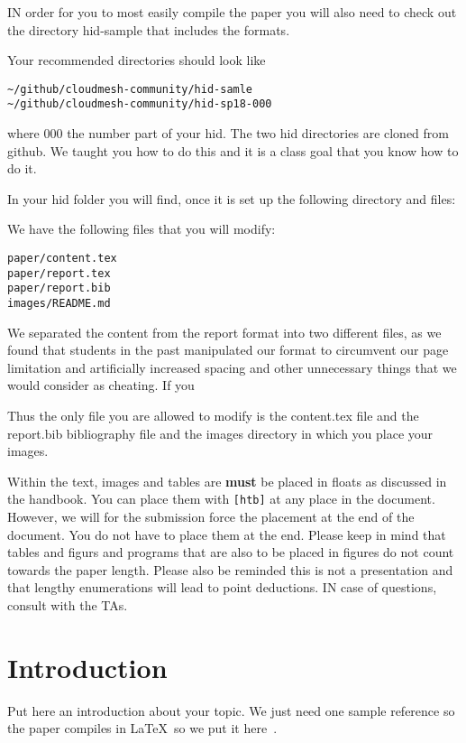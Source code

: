 IN order for you to most easily compile the paper you will also need
to check out the directory hid-sample that includes the formats. 

Your recommended directories should look like

\begin{verbatim}
~/github/cloudmesh-community/hid-samle
~/github/cloudmesh-community/hid-sp18-000
\end{verbatim}

where 000 the number part of your hid. The two hid directories are
cloned from github. We taught you how to do this and it is a class
goal that you know how to do it. 

In your hid folder you will find, once it is set up the following
directory and files:


We have the following files that you will modify:

\begin{verbatim}
paper/content.tex
paper/report.tex
paper/report.bib
images/README.md
\end{verbatim}

We separated the content from the report format into two different
files, as we found that students in the past manipulated our format to
circumvent our page limitation and artificially increased spacing and
other unnecessary things that we would consider as cheating.
If you

Thus the only file you are allowed to modify is the content.tex file
and the report.bib bibliography file and the images directory in which
you place your images.

Within the text, images and tables are {\bf must} be placed in floats
as discussed in the handbook. You can place them with \verb|[htb]| at
any place in the document. However, we will for the submission force
the placement at the end of the document. You do not have to place
them at the end. Please keep in mind that tables and figurs and
programs that are also to be placed in figures do not count towards
the paper length. Please also be reminded this is not a presentation
and that lengthy enumerations will lead to point deductions. IN case
of questions, consult with the TAs.

\section{Introduction}

Put here an introduction about your topic. 
We just need one sample reference so the paper compiles in \LaTeX\ so we
put it here~\cite{editor00}.

